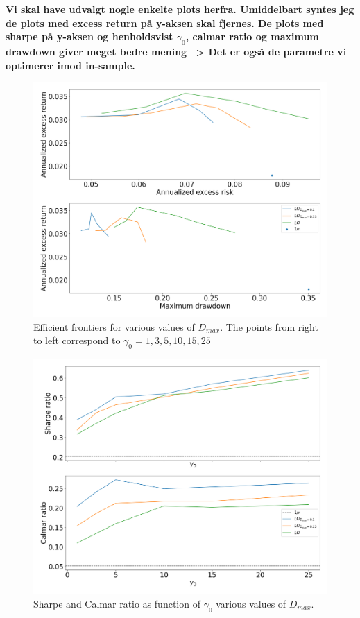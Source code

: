 \textbf{Vi skal have udvalgt nogle enkelte plots herfra. Umiddelbart syntes jeg de plots med excess return på y-aksen skal fjernes. De plots med sharpe på y-aksen og henholdsvist $\gamma_0$, calmar ratio og maximum drawdown giver meget bedre mening --> Det er også de parametre vi optimerer imod in-sample.}

\begin{figure}[H]
    \centering
    \includegraphics[width=1\textwidth]{analysis/portfolio_exercise/images/mle/frontier_lo.png}
    \caption[Efficient frontiers for various values of $D_{max}$]{Efficient frontiers for various values of $D_{max}$. The points from right to left correspond to $\gamma_0=1,3,5,10,15,25$}
    \label{fig:MPC_frontier_lo}
\end{figure}

\begin{figure}[H]
    \centering
    \includegraphics[width=1\textwidth]{analysis/portfolio_exercise/images/mle/sharpe_frontier_lo.png}
    \caption[Sharpe and Calmar ratio as function of $\gamma_0$ various values of $D_{max}$]{Sharpe and Calmar ratio as function of $\gamma_0$ various values of $D_{max}$.}
    \label{fig:MPC_sharpe_frontier_lo}
\end{figure}


